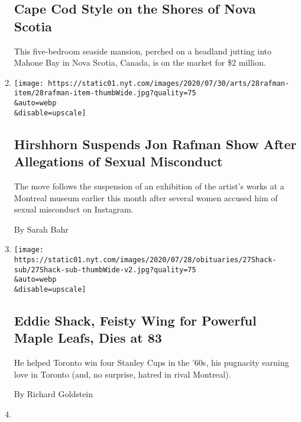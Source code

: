 \begin{enumerate}
  \hypertarget{cape-cod-style-on-the-shores-of-nova-scotia}{%
  \subsection{Cape Cod Style on the Shores of Nova
  Scotia}\label{cape-cod-style-on-the-shores-of-nova-scotia}}

  This five-bedroom seaside mansion, perched on a headland jutting into
  Mahone Bay in Nova Scotia, Canada, is on the market for \$2 million.
\item
  \href{/2020/07/28/arts/design/hirshhorn-museum-jon-rafman.html}{}

  \texttt{[image: https://static01.nyt.com/images/2020/07/30/arts/28rafman-item/28rafman-item-thumbWide.jpg?quality=75\\\&auto=webp\\\&disable=upscale]}

  \hypertarget{hirshhorn-suspends-jon-rafman-show-after-allegations-of-sexual-misconduct}{%
  \subsection{Hirshhorn Suspends Jon Rafman Show After Allegations of
  Sexual
  Misconduct}\label{hirshhorn-suspends-jon-rafman-show-after-allegations-of-sexual-misconduct}}

  The move follows the suspension of an exhibition of the artist's works
  at a Montreal museum earlier this month after several women accused
  him of sexual misconduct on Instagram.

  By Sarah Bahr
\item
  \href{/2020/07/27/sports/hockey/eddie-shack-feisty-wing-for-powerful-maple-leafs-dies-at-83.html}{}

  \texttt{[image: https://static01.nyt.com/images/2020/07/28/obituaries/27Shack-sub/27Shack-sub-thumbWide-v2.jpg?quality=75\\\&auto=webp\\\&disable=upscale]}

  \hypertarget{eddie-shack-feisty-wing-for-powerful-maple-leafs-dies-at-83}{%
  \subsection{Eddie Shack, Feisty Wing for Powerful Maple Leafs, Dies at
  83}\label{eddie-shack-feisty-wing-for-powerful-maple-leafs-dies-at-83}}

  He helped Toronto win four Stanley Cups in the '60s, his pugnacity
  earning love in Toronto (and, no surprise, hatred in rival Montreal).

  By Richard Goldstein
\item
  \href{/2020/07/25/at-home/coronavirus-true-crime-podcasts-race.html}{}


\end{enumerate}
